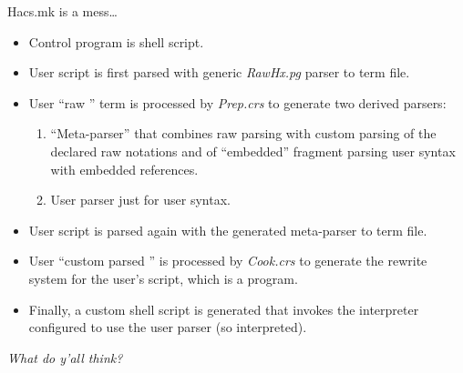 \documentclass[pdftex,aspectratio=169,14pt]{beamer}
\begin{document}
\begin{frame}[shrink]{Hacs.mk is a mess…}
  \begin{itemize}

  \item Control program is shell script.

  \item User script is first parsed with generic \emph{RawHx.pg} parser to \CRSX term file.

  \item User ``raw \HAX'' term is processed by \emph{Prep.crs} to generate two derived parsers:
    \begin{enumerate}
    \item ``Meta-parser'' that combines raw parsing with custom parsing of the declared raw
      notations and of ``embedded'' fragment parsing user syntax with embedded references.
    \item User parser just for user syntax.
    \end{enumerate}

  \item User script is parsed again with the generated meta-parser to \CRSX term file.

  \item User ``custom parsed \HAX'' is processed by \emph{Cook.crs} to generate the rewrite system
    for the user's script, which is a \CRSX program.

  \item Finally, a custom shell script is generated that invokes the \CRSX interpreter configured to
    use the user parser (so interpreted).

  \end{itemize}
\end{frame}

\begin{frame}
  \begin{center}
    \alert{\emph{What do y'all think?}}
  \end{center}
\end{frame}
 
\end{document}
